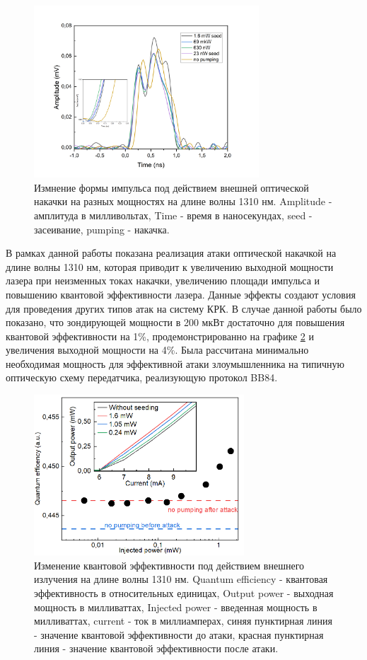 \begin{figure}
    \centering
    \includegraphics[width=0.75\textwidth]{images/Импульсы под действием 1310 для диссера.png}
    \caption{Измнение формы импульса под действием внешней оптической накачки на разных мощностях на длине волны 1310 нм. Amplitude - амплитуда в милливольтах, Time - время в наносекундах, seed - засеивание, pumping - накачка.}
    \label{fig:pulses 1310 ref}
\end{figure}
\newpage В рамках данной работы показана реализация атаки оптической накачкой на длине волны 1310 нм, которая приводит к увеличению выходной мощности лазера при неизменных токах накачки, увеличению площади импульса и повышению квантовой эффективности лазера. Данные эффекты создают условия для проведения других типов атак на систему КРК. В случае данной работы было показано, что зондирующей мощности в 200 мкВт достаточно для повышения квантовой эффективности на 1\%, продемонстрированно на графике \ref{fig:eff ref} и увеличения выходной мощности на 4\%. Была рассчитана минимально необходимая мощность для эффективной атаки злоумышленника на типичную оптическую схему передатчика, реализующую протокол BB84.
\begin{figure}
    \centering
    \includegraphics[width=0.7\textwidth]{images/Эффективность 1310.png}
    \caption{Изменение квантовой эффективности под действием внешнего излучения на длине волны 1310 нм. Quantum efficiency - квантовая эффективность в относительных единицах, Output power - выходная мощность в милливаттах, Injected power - введенная мощность в милливаттах, current - ток в миллиамперах, синяя пунктирная линия - значение квантовой эффективности до атаки, красная пунктирная линия - значение квантовой эффективности после атаки. }
    \label{fig:eff ref}
\end{figure}
